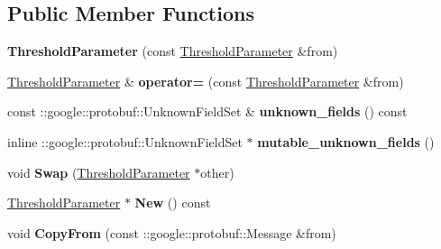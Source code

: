 \subsection*{Public Member Functions}
\begin{DoxyCompactItemize}
\item 
\mbox{\label{classcaffe_1_1_threshold_parameter_a44359cb1b2ed1e0e6ee5103d7edb6b65}} 
{\bfseries Threshold\+Parameter} (const \mbox{\hyperlink{classcaffe_1_1_threshold_parameter}{Threshold\+Parameter}} \&from)
\item 
\mbox{\label{classcaffe_1_1_threshold_parameter_a1dbdd6ea552168143b43f380c22c3f9d}} 
\mbox{\hyperlink{classcaffe_1_1_threshold_parameter}{Threshold\+Parameter}} \& {\bfseries operator=} (const \mbox{\hyperlink{classcaffe_1_1_threshold_parameter}{Threshold\+Parameter}} \&from)
\item 
\mbox{\label{classcaffe_1_1_threshold_parameter_af8a41b3d0ef47377216d6a14645c0e50}} 
const \+::google\+::protobuf\+::\+Unknown\+Field\+Set \& {\bfseries unknown\+\_\+fields} () const
\item 
\mbox{\label{classcaffe_1_1_threshold_parameter_ad4050bad300b5f7391f80a3fd3092652}} 
inline \+::google\+::protobuf\+::\+Unknown\+Field\+Set $\ast$ {\bfseries mutable\+\_\+unknown\+\_\+fields} ()
\item 
\mbox{\label{classcaffe_1_1_threshold_parameter_a65d719574eccf0914af64db50842f119}} 
void {\bfseries Swap} (\mbox{\hyperlink{classcaffe_1_1_threshold_parameter}{Threshold\+Parameter}} $\ast$other)
\item 
\mbox{\label{classcaffe_1_1_threshold_parameter_a21d75666991751acebfced3d6cc9c7f3}} 
\mbox{\hyperlink{classcaffe_1_1_threshold_parameter}{Threshold\+Parameter}} $\ast$ {\bfseries New} () const
\item 
\mbox{\label{classcaffe_1_1_threshold_parameter_af3cffd744c35d31f29af3fa163f47bfe}} 
void {\bfseries Copy\+From} (const \+::google\+::protobuf\+::\+Message \&from)
\item 

\end{DoxyCompactItemize}
